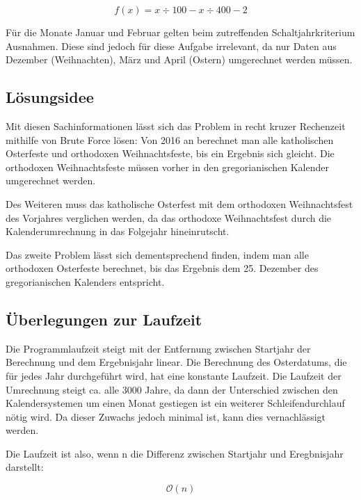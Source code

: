 	\[f(x)=x\div{}100-x\div{}400-2\]

	Für die Monate Januar und Februar gelten beim zutreffenden Schaltjahrkriterium Ausnahmen. Diese sind jedoch für diese Aufgabe irrelevant, da nur Daten aus Dezember (Weihnachten), März und April (Ostern) umgerechnet werden müssen.

\clearpage
\subsection {Lösungsidee}
	Mit diesen Sachinformationen lässt sich das Problem in recht kruzer Rechenzeit mithilfe von Brute Force lösen: Von 2016 an berechnet man alle katholischen Osterfeste und orthodoxen Weihnachtsfeste, bis ein Ergebnis sich gleicht. Die orthodoxen Weihnachtsfeste müssen vorher in den gregorianischen Kalender umgerechnet werden. 

	Des Weiteren muss das katholische Osterfest mit dem orthodoxen Weihnachtsfest des Vorjahres verglichen werden, da das orthodoxe Weihnachtsfest  durch die Kalenderumrechnung in das Folgejahr hineinrutscht.

	Das zweite Problem lässt sich dementsprechend finden, indem man alle orthodoxen Osterfeste berechnet, bis das Ergebnis dem 25. Dezember des gregorianischen Kalenders entspricht.

\subsection {Überlegungen zur Laufzeit}
Die Programmlaufzeit steigt mit der Entfernung zwischen Startjahr der Berechnung und dem Ergebnisjahr linear. Die Berechnung des Osterdatums, die für jedes Jahr durchgeführt wird, hat eine konstante Laufzeit. Die Laufzeit der Umrechnung steigt ca. alle 3000 Jahre, da dann der Unterschied zwischen den Kalendersystemen um einen Monat gestiegen ist ein weiterer Schleifendurchlauf nötig wird. Da dieser Zuwachs jedoch minimal ist, kann dies vernachlässigt werden.

Die Laufzeit ist also, wenn n die Differenz zwischen Startjahr und Eregbnisjahr darstellt:

\[\mathcal O(n)\]
